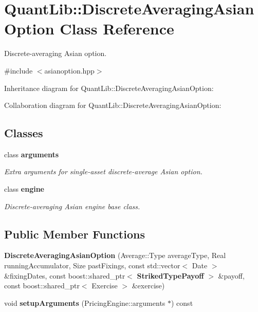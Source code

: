 \section{Quant\+Lib\+:\+:Discrete\+Averaging\+Asian\+Option Class Reference}
\label{class_quant_lib_1_1_discrete_averaging_asian_option}


Discrete-\/averaging Asian option.  




{\ttfamily \#include $<$asianoption.\+hpp$>$}



Inheritance diagram for Quant\+Lib\+:\+:Discrete\+Averaging\+Asian\+Option\+:


Collaboration diagram for Quant\+Lib\+:\+:Discrete\+Averaging\+Asian\+Option\+:
\subsection*{Classes}
\begin{DoxyCompactItemize}
\item 
class {\bf arguments}
\begin{DoxyCompactList}\small\item\em Extra arguments for single-\/asset discrete-\/average Asian option. \end{DoxyCompactList}\item 
class {\bf engine}
\begin{DoxyCompactList}\small\item\em Discrete-\/averaging Asian engine base class. \end{DoxyCompactList}\end{DoxyCompactItemize}
\subsection*{Public Member Functions}
\begin{DoxyCompactItemize}
\item 
{\bfseries Discrete\+Averaging\+Asian\+Option} (Average\+::\+Type average\+Type, Real running\+Accumulator, Size past\+Fixings, const std\+::vector$<$ Date $>$ \&fixing\+Dates, const boost\+::shared\+\_\+ptr$<$ {\bf Striked\+Type\+Payoff} $>$ \&payoff, const boost\+::shared\+\_\+ptr$<$ Exercise $>$ \&exercise)\label{class_quant_lib_1_1_discrete_averaging_asian_option_a94f3099b52f8b6e97d8d2266ae8c5272}

\item 
void {\bfseries setup\+Arguments} (Pricing\+Engine\+::arguments $\ast$) const \label{class_quant_lib_1_1_discrete_averaging_asian_option_a0f3e0409d17a9a039502fc27aa9161ea}

\end{DoxyCompactItemize}
